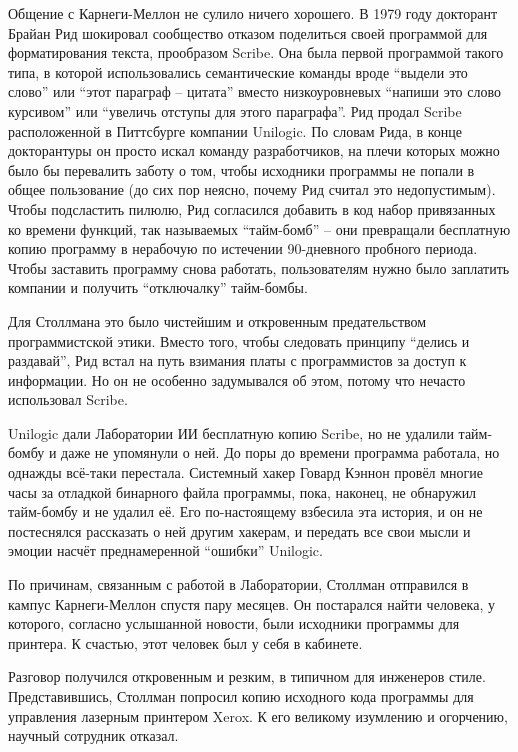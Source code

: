 Общение с Карнеги-Меллон не сулило ничего хорошего. В 1979 году докторант Брайан Рид шокировал сообщество отказом поделиться своей программой для форматирования текста, прообразом Scribe. Она была первой программой такого типа, в которой использовались семантические команды вроде \enquote{выдели это слово} или \enquote{этот параграф -- цитата} вместо низкоуровневых \enquote{напиши это слово курсивом} или \enquote{увеличь отступы для этого параграфа}. Рид продал Scribe расположенной в Питтсбурге компании Unilogic. По словам Рида, в конце докторантуры он просто искал команду разработчиков, на плечи которых можно было бы перевалить заботу о том, чтобы исходники программы не попали в общее пользование (до сих пор неясно, почему Рид считал это недопустимым). Чтобы подсластить пилюлю, Рид согласился добавить в код набор привязанных ко времени функций, так называемых \enquote{тайм-бомб} -- они превращали бесплатную копию программу в нерабочую по истечении 90-дневного пробного периода. Чтобы заставить программу снова работать, пользователям нужно было заплатить компании и получить \enquote{отключалку} тайм-бомбы.

Для Столлмана это было чистейшим и откровенным предательством программистской этики. Вместо того, чтобы следовать принципу \enquote{делись и раздавай}, Рид встал на путь взимания платы с программистов за доступ к информации. Но он не особенно задумывался об этом, потому что нечасто использовал Scribe.

Unilogic дали Лаборатории ИИ бесплатную копию Scribe, но не удалили тайм-бомбу и даже не упомянули о ней. До поры до времени программа работала, но однажды всё-таки перестала. Системный хакер Говард Кэннон провёл многие часы за отладкой бинарного файла программы, пока, наконец, не обнаружил тайм-бомбу и не удалил её. Его по-настоящему взбесила эта история, и он не постеснялся рассказать о ней другим хакерам, и передать все свои мысли и эмоции насчёт преднамеренной \enquote{ошибки} Unilogic.

По причинам, связанным с работой в Лаборатории, Столлман отправился в кампус Карнеги-Меллон спустя пару месяцев. Он постарался найти человека, у которого, согласно услышанной новости, были исходники программы для принтера. К счастью, этот человек был у себя в кабинете.

Разговор получился откровенным и резким, в типичном для инженеров стиле. Представившись, Столлман попросил копию исходного кода программы для управления лазерным принтером Xerox. К его великому изумлению и огорчению, научный сотрудник отказал.

